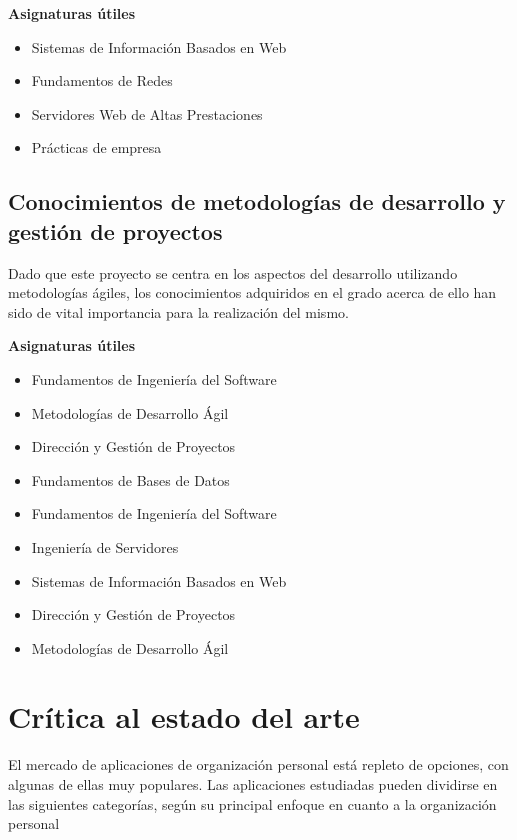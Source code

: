\documentclass[10pt, a4paper]{aqademic}
\begin{document}
\textbf{Asignaturas útiles}

\begin{itemize}
	\item Sistemas de Información Basados en Web
	\item Fundamentos de Redes
	\item Servidores Web de Altas Prestaciones
	\item Prácticas de empresa
\end{itemize}


\subsection*{Conocimientos de metodologías de desarrollo y gestión de proyectos}

Dado que este proyecto se centra en los aspectos del desarrollo utilizando metodologías ágiles, los conocimientos adquiridos en el grado acerca de ello han sido de vital importancia para la realización del mismo.

\textbf{Asignaturas útiles}

\begin{itemize}
	\item Fundamentos de Ingeniería del Software
	\item Metodologías de Desarrollo Ágil
	\item Dirección y Gestión de Proyectos
\end{itemize}


\begin{itemize}
	\item Fundamentos de Bases de Datos
	\item Fundamentos de Ingeniería del Software
	\item Ingeniería de Servidores
	\item Sistemas de Información Basados en Web
	\item Dirección y Gestión de Proyectos
	\item Metodologías de Desarrollo Ágil
\end{itemize}


\section{Crítica al estado del arte}

El mercado de aplicaciones de organización personal está repleto de opciones, con algunas de ellas muy populares. Las aplicaciones estudiadas pueden dividirse en las siguientes categorías, según su principal enfoque en cuanto a la organización personal
\end{document}
